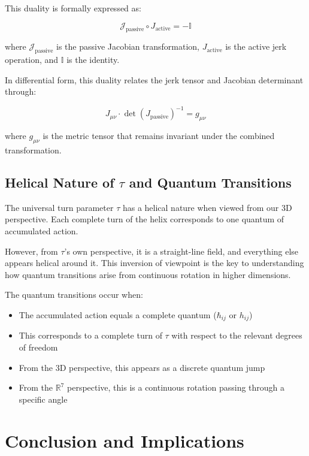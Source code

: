 \documentclass{article}
\begin{document}
This duality is formally expressed as:

\begin{equation}
\mathcal{J}_{\text{passive}} \circ J_{\text{active}} = -\mathbb{I}
\end{equation}

where $\mathcal{J}_{\text{passive}}$ is the passive Jacobian transformation, $J_{\text{active}}$ is the active jerk operation, and $\mathbb{I}$ is the identity.

In differential form, this duality relates the jerk tensor and Jacobian determinant through:

\begin{equation}
J_{\mu\nu} \cdot \det(J_{\text{passive}})^{-1} = g_{\mu\nu}
\end{equation}

where $g_{\mu\nu}$ is the metric tensor that remains invariant under the combined transformation.

\subsection{Helical Nature of $\tau$ and Quantum Transitions}

The universal turn parameter $\tau$ has a helical nature when viewed from our 3D perspective. Each complete turn of the helix corresponds to one quantum of accumulated action.

However, from $\tau$'s own perspective, it is a straight-line field, and everything else appears helical around it. This inversion of viewpoint is the key to understanding how quantum transitions arise from continuous rotation in higher dimensions.

The quantum transitions occur when:
\begin{itemize}
\item The accumulated action equals a complete quantum ($\hbar_{ij}$ or $h_{ij}$)
\item This corresponds to a complete turn of $\tau$ with respect to the relevant degrees of freedom
\item From the 3D perspective, this appears as a discrete quantum jump
\item From the $\mathbb{R}^7$ perspective, this is a continuous rotation passing through a specific angle
\end{itemize}

\section{Conclusion and Implications}
\end{document}
